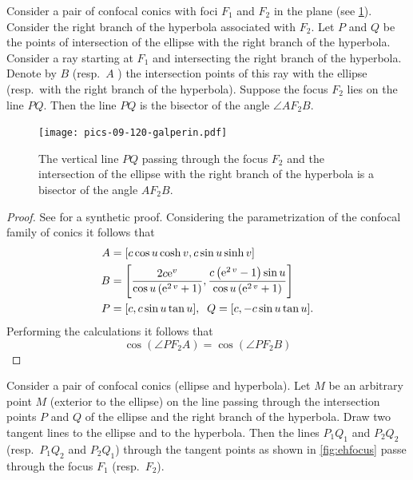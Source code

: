 \begin{theorem}%
Consider a pair of confocal conics with foci $F_1$ and $F_2$ in the plane (see   \cref{fig:galperin}).
  Consider  the right branch of the hyperbola associated with $F_2$. Let $P$
and $Q$ be the points of intersection of the ellipse with the right branch of the hyperbola.
Consider a ray starting at $F_1$ and intersecting the right branch of the hyperbola. Denote
by $B$ (resp.\ $A$ ) the intersection points of this ray with the ellipse (resp.\  with the right branch of the
hyperbola). Suppose the focus $F_2$ lies on the line $P Q$. Then the line $P Q$ is the bisector of the
angle $  \angle  AF_2B$.  
\end{theorem}
\begin{figure} 
	\begin{center}
  \texttt{[image: pics-09-120-galperin.pdf]}
	\caption { The vertical line $PQ$ passing through the focus $F_2$ and the intersection of the ellipse with the right branch of the hyperbola  is a bisector of the angle $AF_2B$.}
		 \label{fig:galperin}
	\end{center}
\end{figure}
\begin{proof}
See \cite{dolgirev2014} for a synthetic proof.
Considering the parametrization of the confocal family  of conics it follows that
\begin{align*}
    A&=[c\cos u\cosh v,c \sin u \sinh v]\\
    B&=\left[ {\frac {2c{{\rm e}^{v}}}{\cos u \left( {
{\rm e}^{2\,v}}+1 \right) }},{\frac { c \left( {{\rm e}^{2\,v}}-1
 \right) \sin u  }{\cos u
 \left( {{\rm e}^{2\,v}}+1 \right) }}\right]\\
    P&=[c,c\sin u\tan u],\;\;Q=[c,-c\sin u\tan u].  
\end{align*}
Performing the calculations it follows that
\[\cos(\angle PF_2A)=\cos(\angle PF_2B)\]
\end{proof}

\begin{theorem}\label{th:ehfocus}
Consider a pair of confocal conics (ellipse and hyperbola). Let $M$ be  an arbitrary point $M$ (exterior to the ellipse)
on the line passing through the intersection points $P$ and $Q$ of the ellipse and the right branch of
the hyperbola. Draw two tangent lines to the ellipse and to the hyperbola. Then the   lines $P_1Q_1$ and $P_2Q_2$ (resp.\ $P_1Q_2$ and $P_2Q_1$)
through the tangent points as shown in \cref{fig:ehfocus}  passe  through the focus $F_1$ (resp.\   $F_2$). 
\end{theorem}


